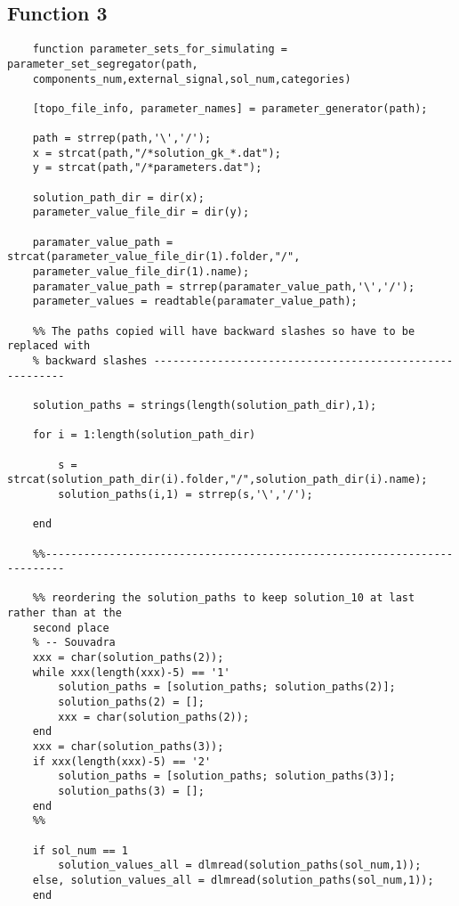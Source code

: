 \documentclass{article}
\begin{document}
\subsection*{Function 3}
\begin{verbatim}
    function parameter_sets_for_simulating = parameter_set_segregator(path,
    components_num,external_signal,sol_num,categories)

    [topo_file_info, parameter_names] = parameter_generator(path);
    
    path = strrep(path,'\','/');
    x = strcat(path,"/*solution_gk_*.dat");
    y = strcat(path,"/*parameters.dat");
    
    solution_path_dir = dir(x);
    parameter_value_file_dir = dir(y);
    
    paramater_value_path = strcat(parameter_value_file_dir(1).folder,"/",
    parameter_value_file_dir(1).name);
    paramater_value_path = strrep(paramater_value_path,'\','/');
    parameter_values = readtable(paramater_value_path);
    
    %% The paths copied will have backward slashes so have to be replaced with 
    % backward slashes --------------------------------------------------------
    
    solution_paths = strings(length(solution_path_dir),1);
    
    for i = 1:length(solution_path_dir)
        
        s = strcat(solution_path_dir(i).folder,"/",solution_path_dir(i).name);
        solution_paths(i,1) = strrep(s,'\','/');
        
    end
    
    %%-------------------------------------------------------------------------
    
    %% reordering the solution_paths to keep solution_10 at last rather than at the 
    second place 
    % -- Souvadra 
    xxx = char(solution_paths(2));
    while xxx(length(xxx)-5) == '1'
        solution_paths = [solution_paths; solution_paths(2)];
        solution_paths(2) = [];
        xxx = char(solution_paths(2));
    end
    xxx = char(solution_paths(3));
    if xxx(length(xxx)-5) == '2'
        solution_paths = [solution_paths; solution_paths(3)];
        solution_paths(3) = [];
    end
    %%
    
    if sol_num == 1
        solution_values_all = dlmread(solution_paths(sol_num,1));
    else, solution_values_all = dlmread(solution_paths(sol_num,1));
    end
    

\end{verbatim}
\end{document}
